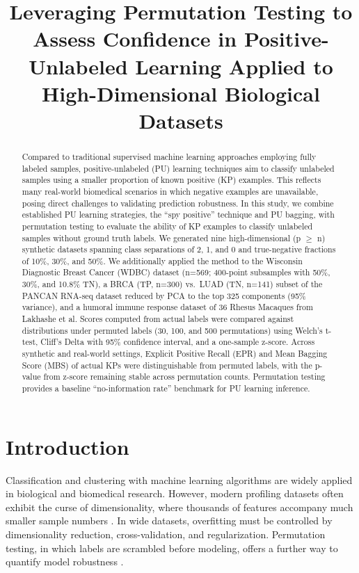 \documentclass[11pt]{article}
\title{Leveraging Permutation Testing to Assess Confidence in Positive-Unlabeled Learning Applied to High-Dimensional Biological Datasets}
\author{}
\date{}
\begin{document}
\maketitle

\begin{abstract}
Compared to traditional supervised machine learning approaches employing fully labeled samples, positive-unlabeled (PU) learning techniques aim to classify unlabeled samples using a smaller proportion of known positive (KP) examples. This reflects many real-world biomedical scenarios in which negative examples are unavailable, posing direct challenges to validating prediction robustness. In this study, we combine established PU learning strategies, the ``spy positive'' technique and PU bagging, with permutation testing to evaluate the ability of KP examples to classify unlabeled samples without ground truth labels. We generated nine high-dimensional (p $\geq$ n) synthetic datasets spanning class separations of 2, 1, and 0 and true-negative fractions of 10\%, 30\%, and 50\%. We additionally applied the method to the Wisconsin Diagnostic Breast Cancer (WDBC) dataset (n=569; 400-point subsamples with 50\%, 30\%, and 10.8\% TN), a BRCA (TP, n=300) vs.\ LUAD (TN, n=141) subset of the PANCAN RNA-seq dataset reduced by PCA to the top 325 components (95\% variance), and a humoral immune response dataset of 36 Rhesus Macaques from Lakhashe et al. Scores computed from actual labels were compared against distributions under permuted labels (30, 100, and 500 permutations) using Welch's t-test, Cliff's Delta with 95\% confidence interval, and a one-sample z-score. Across synthetic and real-world settings, Explicit Positive Recall (EPR) and Mean Bagging Score (MBS) of actual KPs were distinguishable from permuted labels, with the p-value from z-score remaining stable across permutation counts. Permutation testing provides a baseline ``no-information rate'' benchmark for PU learning inference.
\end{abstract}

\section{Introduction}
Classification and clustering with machine learning algorithms are widely applied in biological and biomedical research. However, modern profiling datasets often exhibit the curse of dimensionality, where thousands of features accompany much smaller sample numbers \cite{bellman1961}. In wide datasets, overfitting must be controlled by dimensionality reduction, cross-validation, and regularization. Permutation testing, in which labels are scrambled before modeling, offers a further way to quantify model robustness \cite{ojala2010permutation,good2005permutation}.
\end{document}
